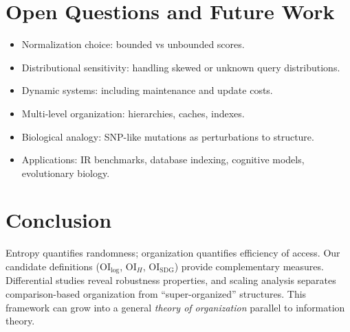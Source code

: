 \documentclass[11pt]{article}
\begin{document}
\section{Open Questions and Future Work}
\begin{itemize}
  \item Normalization choice: bounded vs unbounded scores.
  \item Distributional sensitivity: handling skewed or unknown query
  distributions.
  \item Dynamic systems: including maintenance and update costs.
  \item Multi-level organization: hierarchies, caches, indexes.
  \item Biological analogy: SNP-like mutations as perturbations to structure.
  \item Applications: IR benchmarks, database indexing, cognitive models,
  evolutionary biology.
\end{itemize}

\section{Conclusion}
Entropy quantifies randomness; organization quantifies efficiency of access.
Our candidate definitions ($\mathrm{OI}_{\log}$, $\mathrm{OI}_H$,
$\mathrm{OI}_{\text{SDG}}$) provide complementary measures. Differential studies
reveal robustness properties, and scaling analysis separates comparison-based
organization from ``super-organized'' structures. This framework can grow into a
general \emph{theory of organization} parallel to information theory.


\end{document}

